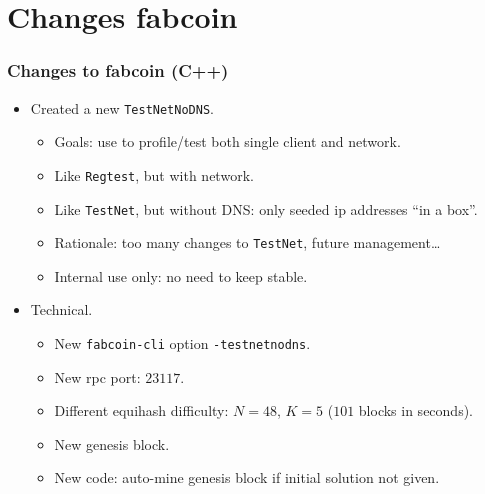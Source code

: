 \section{Changes fabcoin}
\begin{frame}[fragile]
\frametitle{Changes to fabcoin (C++)}
\begin{itemize}
\item Created a new \verb|TestNetNoDNS|.
\begin{itemize}
\item Goals: use to profile/test both single client and network.
\item Like \verb|Regtest|, but with network. 
\item Like \verb|TestNet|, but without DNS: only seeded ip addresses ``in a box''. 
\item Rationale: too many changes to \verb|TestNet|, future management\dots
\item Internal use only: no need to keep stable.
\end{itemize}
\item Technical.
\begin{itemize}
\item New \verb|fabcoin-cli| option \verb|-testnetnodns|.
\item New rpc port: $23117$.
\item Different equihash difficulty: $N=48$, $K=5$ ($101$ blocks in seconds).
\item New genesis block.
\item New code: auto-mine genesis block if initial solution not given.
\end{itemize}
\end{itemize}

\end{frame}